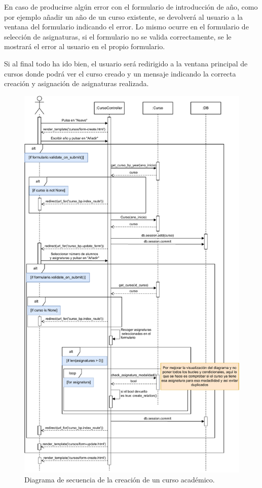 \begin{itemize}
En caso de producirse algún error con el formulario de introducción de año, como por ejemplo añadir un año de un curso existente, se devolverá al usuario a la ventana del formulario indicando el error. Lo mismo ocurre en el formulario de selección de asignaturas, si el formulario no se valida correctamente, se le mostrará el error al usuario en el propio formulario.

Si al final todo ha ido bien, el usuario será redirigido a la ventana principal de cursos donde podrá ver el curso creado y un mensaje indicando la correcta creación y asignación de asignaturas realizada.


\begin{figure}
	\centering
	\includegraphics[width=.9\textwidth]{../img/Anexos/Diagramas secuencia/DS - crear curso.pdf}
	\caption{Diagrama de secuencia de la creación de un curso académico.}\label{DS-crearCurso}
\end{figure}



\end{itemize}
